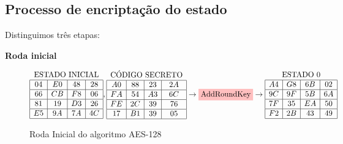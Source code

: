 \subsection{Processo de encriptação do estado}
Distinguimos três etapas:
\begin{center}{\bf Roda inicial}\end{center}
\begin{figure}[!ht]
\begin{figurebox}
\begin{center}
$\begin{array}{|c|c|c|c|}
\multicolumn{4}{c}{\text{ESTADO INICIAL}}\\\hline
04 & E0 & 48 & 28\\\hline
66 & CB & F8 & 06\\\hline
81 & 19 & D3 & 26\\\hline
E5 & 9A & 7A & 4C\\\hline
\end{array},
\begin{array}{|c|c|c|c|}
\multicolumn{4}{c}{\text{CÓDIGO SECRETO}}\\\hline
A0 & 88 & 23 & 2A\\\hline
FA & 54 & A3 & 6C\\\hline
FE & 2C & 39 & 76\\\hline
17 & B1 & 39 & 05\\\hline
\end{array}\rightarrow
\colorbox{pink}{AddRoundKey}\rightarrow \begin{array}{|c|c|c|c|}
\multicolumn{4}{c}{\text{ESTADO 0}}\\\hline
A4 & G8 & 6B & 02\\\hline
9C & 9F & 5B & 6A\\\hline
7F & 35 & EA & 50\\\hline
F2 & 2B & 43 & 49\\\hline
\end{array}
$
\end{center}\caption{Roda Inicial do algoritmo AES-128}\label{fig:inputaes1}
\end{figurebox}
\end{figure}


